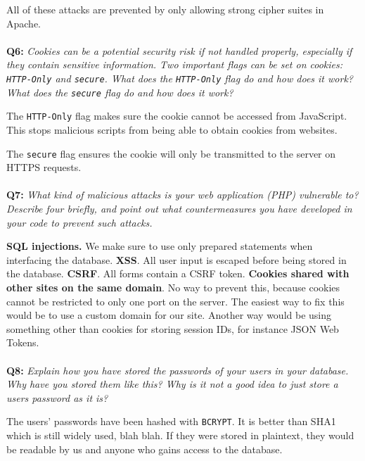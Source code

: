 All of these attacks are prevented by only allowing strong cipher suites in Apache.

\paragraph{}
\textbf{Q6:}
\cprotect\textit{Cookies can be a potential security risk if not handled properly, especially if they contain sensitive information. Two important flags can be set on cookies: \verb/HTTP-Only/ and \verb/secure/. What does the \verb/HTTP-Only/ flag do and how does it work? What does the \verb/secure/ flag do and how does it work?}

The \verb/HTTP-Only/ flag makes sure the cookie cannot be accessed from JavaScript. This stops malicious scripts from being able to obtain cookies from websites.

The \verb/secure/ flag ensures the cookie will only be transmitted to the server on HTTPS requests.

\paragraph{}
\textbf{Q7:}
\textit{What kind of malicious attacks is your web application (PHP) vulnerable to? Describe four briefly, and point out what countermeasures you have developed in your code to prevent such attacks.}

\textbf{SQL injections.} We make sure to use only prepared statements when interfacing the database.
\textbf{XSS}. All user input is escaped before being stored in the database.
\textbf{CSRF}. All forms contain a CSRF token.
\textbf{Cookies shared with other sites on the same domain}. No way to prevent this, because cookies cannot be restricted to only one port on the server.
The easiest way to fix this would be to use a custom domain for our site.
Another way would be using something other than cookies for storing session IDs, for instance JSON Web Tokens.

\paragraph{}
\textbf{Q8:}
\textit{Explain how you have stored the passwords of your users in your database. Why have you stored them like this? Why is it not a good idea to just store a users password as it is?}

The users' passwords have been hashed with \verb/BCRYPT/.
It is better than SHA1 which is still widely used, blah blah.
If they were stored in plaintext, they would be readable by us and anyone who gains access to the database.
